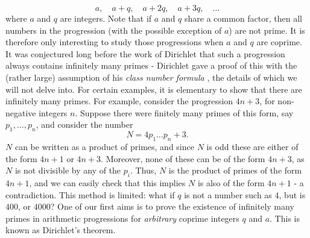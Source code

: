 \begin{equation}
    a, \quad a + q, \quad a + 2q, \quad a + 3q, \quad \dots \nonumber
\end{equation}
where $a$ and $q$ are integers. Note that if $a$ and $q$ share a common factor, then all numbers in the progression (with the possible exception of $a$) are not prime. It is therefore only interesting to study those progressions when $a$ and $q$ are coprime. It was conjectured long before the work of Dirichlet that such a progression always contains infinitely many primes - Dirichlet gave a proof of this with the (rather large) assumption of his \textit{class number formula} \cite[p.~1]{davenport}, the details of which we will not delve into. For certain examples, it is elementary to show that there are infinitely many primes. For example, consider the progression $4n + 3$, for non-negative integers $n$. Suppose there were finitely many primes of this form, say $p_1, \dots, p_n$, and consider the number 
\begin{equation}
    N = 4 p_1 \dots p_n + 3. \nonumber
\end{equation}
$N$ can be written as a product of primes, and since $N$ is odd these are either of the form $4n + 1$ or $4n + 3$. Moreover, none of these can be of the form $4n + 3$, as $N$ is not divisible by any of the $p_i$. Thus, $N$ is the product of primes of the form $4n + 1$, and we can easily check that this implies $N$ is also of the form $4n + 1$ - a contradiction. This method is limited: what if $q$ is not a number such as $4$, but is $400$, or $4000$? One of our first aims is to prove the existence of infinitely many primes in arithmetic progressions for \textit{arbitrary} coprime integers $q$ and $a$. This is known as Dirichlet's theorem.\\

